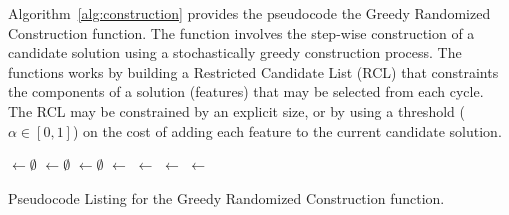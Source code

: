 Algorithm~\ref{alg:construction} provides the pseudocode the Greedy Randomized Construction function. The function involves the step-wise construction of a candidate solution using a stochastically greedy construction process. The functions works by building a Restricted Candidate List (RCL) that constraints the components of a solution (features) that may be selected from each cycle. The RCL may be constrained by an explicit size, or by using a threshold ($\alpha \in [0,1]$) on the cost of adding each feature to the current candidate solution.

\begin{algorithm}[htp]
	\SetLine

	\KwIn{\Alpha}
	\KwOut{\Candidate}
	\Candidate $\leftarrow \emptyset$\;
	\While{\Candidate $\neq$ \ProblemSize} {
		\FeatureCosts $\leftarrow \emptyset$\;
		\For{\ProblemFeature $\notin$ \Candidate}{
			\FeatureCosts $\leftarrow$ \CostImpactOfFeature{\Candidate, \ProblemFeature}\;
		}
		\RCL $\leftarrow \emptyset$\;
		\ProblemFeatureMinCost $\leftarrow$ \MinCost{\FeatureCosts}\;
		\ProblemFeatureMaxCost $\leftarrow$ \MaxCost{\FeatureCosts}\;
		\For{\ProblemFeatureCost $\in$ \FeatureCosts} {
			\If{\ProblemFeatureCost $\leq$ $\ProblemFeatureMinCost + \alpha \cdot (\ProblemFeatureMaxCost - \ProblemFeatureMinCost)$ } {
				\RCL $\leftarrow$ \ProblemFeature\;
			}
		}
		\Candidate $\leftarrow$ \SelectRandomFeature{\RCL}\;
	}
	\Return{\Candidate}\;
	\caption{Pseudocode Listing for the Greedy Randomized Construction function.}
	\label{alg:construction}
\end{algorithm}

